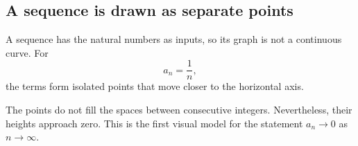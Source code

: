 \subsection{A sequence is drawn as separate points}

A sequence has the natural numbers as inputs, so its graph is not a continuous curve. For
\[
a_n=\frac{1}{n},
\]
the terms form isolated points that move closer to the horizontal axis.

\begin{center}
\end{center}

\begin{interpretationbox}
The points do not fill the spaces between consecutive integers. Nevertheless, their heights approach zero. This is the first visual model for the statement $a_n\to0$ as $n\to\infty$.
\end{interpretationbox}
